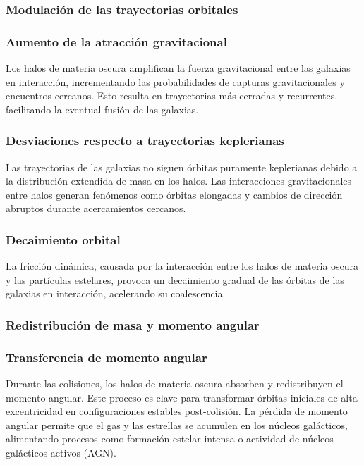\documentclass{article}
\begin{document}
\subsubsection{Modulación de las trayectorias orbitales}
\subsubsection*{Aumento de la atracción gravitacional}

Los halos de materia oscura amplifican la fuerza gravitacional entre las galaxias en interacción, incrementando las probabilidades de capturas gravitacionales y encuentros cercanos. Esto resulta en trayectorias más cerradas y recurrentes, facilitando la eventual fusión de las galaxias.
\subsubsection*{Desviaciones respecto a trayectorias keplerianas}

Las trayectorias de las galaxias no siguen órbitas puramente keplerianas debido a la distribución extendida de masa en los halos. Las interacciones gravitacionales entre halos generan fenómenos como órbitas elongadas y cambios de dirección abruptos durante acercamientos cercanos.
\subsubsection*{Decaimiento orbital}

La fricción dinámica, causada por la interacción entre los halos de materia oscura y las partículas estelares, provoca un decaimiento gradual de las órbitas de las galaxias en interacción, acelerando su coalescencia.
\subsubsection{Redistribución de masa y momento angular}
\subsubsection*{Transferencia de momento angular}

Durante las colisiones, los halos de materia oscura absorben y redistribuyen el momento angular. Este proceso es clave para transformar órbitas iniciales de alta excentricidad en configuraciones estables post-colisión. La pérdida de momento angular permite que el gas y las estrellas se acumulen en los núcleos galácticos, alimentando procesos como formación estelar intensa o actividad de núcleos galácticos activos (AGN).
\end{document}
